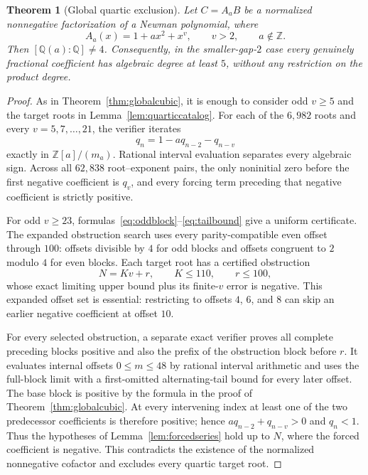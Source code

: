 \documentclass[11pt]{article}
\newtheorem{theorem}{Theorem}[section]
\theoremstyle{remark}
\newcommand{\Q}{\mathbb Q}
\newcommand{\Z}{\mathbb Z}
\numberwithin{equation}{section}
\begin{document}
\begin{theorem}[Global quartic exclusion]\label{thm:globalquartic}
Let $C=A_aB$ be a normalized nonnegative factorization of a Newman polynomial,
where
\[
 A_a(x)=1+a x^2+x^v,\qquad v>2,\qquad a\notin\Z.
\]
Then $[\Q(a):\Q]\ne4$.  Consequently, in the smaller-gap-$2$ case every
genuinely fractional coefficient has algebraic degree at least $5$, without
any restriction on the product degree.
\end{theorem}
\begin{proof}
As in Theorem~\ref{thm:globalcubic}, it is enough to consider odd $v\ge5$ and
the target roots in Lemma~\ref{lem:quarticcatalog}.  For each of the $6{,}982$
roots and every $v=5,7,\ldots,21$, the verifier iterates
\[
 q_n=1-aq_{n-2}-q_{n-v}
\]
exactly in $\Z[a]/(m_a)$.  Rational interval evaluation separates every
algebraic sign.  Across all $62{,}838$ root--exponent pairs, the only
noninitial zero before the first negative coefficient is $q_v$, and every
forcing term preceding that negative coefficient is strictly positive.

For odd $v\ge23$, formulas~\eqref{eq:oddblock}--\eqref{eq:tailbound} give a
uniform certificate.  The expanded obstruction search uses every
parity-compatible even offset through $100$: offsets divisible by $4$ for odd
blocks and offsets congruent to $2$ modulo $4$ for even blocks.  Each target
root has a certified obstruction
\[
 N=Kv+r,\qquad K\le110,\qquad r\le100,
\]
whose exact limiting upper bound plus its finite-$v$ error is negative.  This
expanded offset set is essential: restricting to offsets $4$, $6$, and $8$
can skip an earlier negative coefficient at offset $10$.

For every selected obstruction, a separate exact verifier proves all complete
preceding blocks positive and also the prefix of the obstruction block before
$r$.  It evaluates internal offsets $0\le m\le48$ by rational interval
arithmetic and uses the full-block limit with a first-omitted alternating-tail
bound for every later offset.  The base block is positive by the formula in
the proof of Theorem~\ref{thm:globalcubic}.  At every intervening index at
least one of the two predecessor coefficients is therefore positive; hence
$a q_{n-2}+q_{n-v}>0$ and $q_n<1$.  Thus the hypotheses of
Lemma~\ref{lem:forcedseries} hold up to $N$, where the forced coefficient is
negative.  This contradicts the existence of the normalized nonnegative
cofactor and excludes every quartic target root.
\end{proof}
\end{document}
